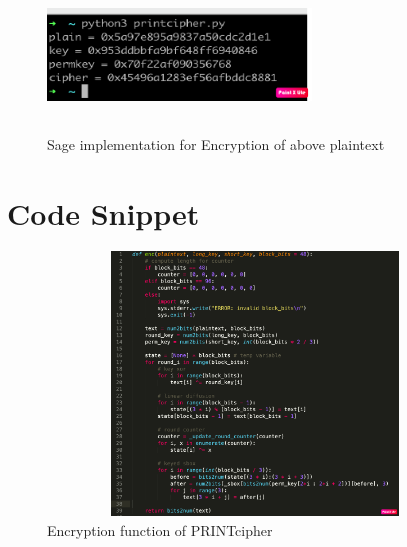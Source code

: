 \documentclass[journal=tosc,preprint]{iacrtrans}
\begin{document}
\begin{figure}[ht]
	\centering
	\includegraphics[height=4cm, width=7cm]{pics/pic_3.png}
	\caption{Sage implementation for Encryption of above plaintext}
\end{figure}


\section*{Code Snippet}
\begin{figure}[ht]
	\centering
	\includegraphics[height=7cm, width=11cm]{pics/codesnippet.png}
	\caption{Encryption function of PRINTcipher}
\end{figure}

%
%
\end{document}
